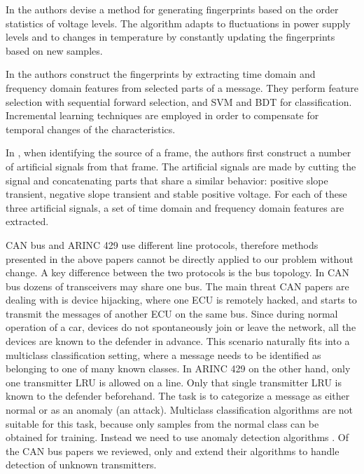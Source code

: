 \documentclass[compsoc,conference,a4paper]{IEEEtran}
\begin{document}
  In \cite{cho2017viden} the authors devise a method for generating fingerprints based on the order statistics of voltage levels. The algorithm adapts to fluctuations in power supply levels and to changes in temperature by constantly updating the fingerprints based on new samples.
  
  In \cite{choi2018voltageids} the authors construct the fingerprints by extracting time domain and frequency domain features from selected parts of a message. They perform feature selection with sequential forward selection, and SVM and BDT for classification. Incremental learning techniques \cite{diehl2003svm} are employed in order to compensate for temporal changes of the characteristics.
  
  In \cite{kneib2018scission}, when identifying the source of a frame, the authors first construct a number of artificial signals from that frame. The artificial signals are made by cutting the signal and concatenating parts that share a similar behavior: positive slope transient, negative slope transient and stable positive voltage. For each of these three artificial signals, a set of time domain and frequency domain features are extracted.
  
  CAN bus and ARINC 429 use different line protocols, therefore methods presented in the above papers cannot be directly applied to our problem without change. A key difference between the two protocols is the bus topology. In CAN bus dozens of transceivers may share one bus. The main threat CAN papers are dealing with is device hijacking, where one ECU is remotely hacked, and starts to transmit the messages of another ECU on the same bus. Since during normal operation of a car, devices do not spontaneously join or leave the network, all the devices are known to the defender in advance. This scenario naturally fits into a multiclass classification setting, where a message needs to be identified as belonging to one of many known classes. In ARINC 429 on the other hand, only one transmitter LRU is allowed on a line. Only that single transmitter LRU is known to the defender beforehand. The task is to categorize a message as either normal or as an anomaly (an attack). Multiclass classification algorithms are not suitable for this task, because only samples from the normal class can be obtained for training. Instead we need to use anomaly detection algorithms \cite{pimentel2014review}. Of the CAN bus papers we reviewed, only \cite{choi2018identifying} and \cite{choi2018voltageids} extend their algorithms to handle detection of unknown transmitters.
  
\end{document}
